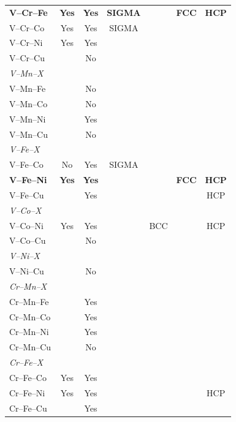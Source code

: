\documentclass[final,5p,times,twocolumn]{elsarticle}
\begin{document}
\begin{longtable}{lcccccc}
\textbf{V--Cr--Fe}   & \textbf{Yes} & \textbf{Yes} & \textbf{SIGMA} &     & \textbf{FCC} & \textbf{HCP} \\
V--Cr--Co   & Yes & Yes &  SIGMA &     &     &     \\
V--Cr--Ni   & Yes & Yes &        &     &     &     \\
V--Cr--Cu   &     & No  &        &     &     &     \\
\hline
\multicolumn{7}{l}{\textit{V--Mn--X}} \\
V--Mn--Fe   &     & No  &        &     &     &     \\
V--Mn--Co   &     & No  &        &     &     &     \\
V--Mn--Ni   &     & Yes &        &     &     &     \\
V--Mn--Cu   &     & No  &        &     &     &     \\
\hline
\multicolumn{7}{l}{\textit{V--Fe--X}} \\
V--Fe--Co   & No  & Yes &  SIGMA &     &     &     \\
\textbf{V--Fe--Ni}   & \textbf{Yes} & \textbf{Yes} &        &     & \textbf{FCC} & \textbf{HCP} \\
V--Fe--Cu   &     & Yes &        &     &     & HCP \\
\hline
\multicolumn{7}{l}{\textit{V--Co--X}} \\
V--Co--Ni   & Yes & Yes &        & BCC &     & HCP \\
V--Co--Cu   &     & No  &        &     &     &     \\
\hline
\multicolumn{7}{l}{\textit{V--Ni--X}} \\
V--Ni--Cu   &     & No  &        &     &     &     \\
\hline
\multicolumn{7}{l}{\textit{Cr--Mn--X}} \\
Cr--Mn--Fe  &     & Yes &        &     &     &     \\
Cr--Mn--Co  &     & Yes &        &     &     &     \\
Cr--Mn--Ni  &     & Yes &        &     &     &     \\
Cr--Mn--Cu  &     & No  &        &     &     &     \\
\hline
\multicolumn{7}{l}{\textit{Cr--Fe--X}} \\
Cr--Fe--Co  & Yes & Yes &        &     &     &     \\
Cr--Fe--Ni  & Yes & Yes &        &     &     & HCP \\
Cr--Fe--Cu  &     & Yes &        &     &     &     \\

\end{longtable}
\end{document}
